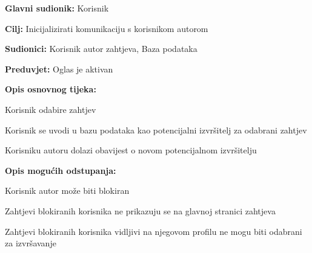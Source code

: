 				\noindent {}
				\begin{packed_item}
					
					\item \textbf{Glavni sudionik: }Korisnik
					\item  \textbf{Cilj:} Inicijalizirati komunikaciju s korisnikom autorom
					\item  \textbf{Sudionici:} Korisnik autor zahtjeva, Baza podataka
					\item  \textbf{Preduvjet:} Oglas je aktivan
					\item  \textbf{Opis osnovnog tijeka:}
					
					\item[] \begin{packed_enum}
						
						\item Korisnik odabire zahtjev
						\item Korisnik se uvodi u bazu podataka kao potencijalni izvršitelj za odabrani zahtjev
						\item Korisniku autoru dolazi obavijest o novom potencijalnom izvršitelju
					\end{packed_enum}
					
					\item  \textbf{Opis mogućih odstupanja:}
					
					\item[] \begin{packed_item}
						
						\item[1.a] Korisnik autor može biti blokiran
						\item[] \begin{packed_enum}
							
							\item Zahtjevi blokiranih korisnika ne prikazuju se na glavnoj stranici zahtjeva
							\item Zahtjevi blokiranih korisnika vidljivi na njegovom profilu ne mogu biti odabrani za izvršavanje
							
						\end{packed_enum}
						
						
					\end{packed_item}
				\end{packed_item}
				
